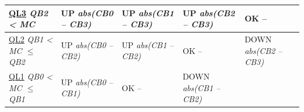 \begin{tabularx}
  {\textwidth}
  { X | X | X | X | X }
  \toprule
      \centering \hspace{4mm} \uline{QL3} \newline \footnotesize \textit{QB2 \textless{} MC} 
    & \centering \hspace{4mm} UP \newline \footnotesize \textit{abs(CB0 -- CB3)} 
    & \centering \hspace{4mm} UP \newline \footnotesize \textit{abs(CB1 -- CB3)} 
    & \centering \hspace{4mm} UP \newline \footnotesize \textit{abs(CB2 -- CB3)} 
    & \centering \hspace{4mm} OK \newline -- 
    \tabularnewline
  \hline
      \centering \hspace{4mm} \uline{QL2} \newline \footnotesize \textit{QB1 \textless{} MC $\leq$ QB2} 
    & \centering \hspace{4mm} UP \newline \footnotesize \textit{abs(CB0 -- CB2)} 
    & \centering \hspace{4mm} UP \newline \footnotesize \textit{abs(CB1 -- CB2)} 
    & \centering \hspace{4mm} OK \newline -- 
    & \centering \hspace{4mm} DOWN \newline \footnotesize \textit{abs(CB2 -- CB3)} 
    \tabularnewline
  \hline
      \centering \hspace{4mm} \uline{QL1} \newline \footnotesize \textit{QB0 \textless{} MC $\leq$ QB1} 
    & \centering \hspace{4mm} UP \newline \footnotesize \textit{abs(CB0 -- CB1)} 
    & \centering \hspace{4mm} OK \newline -- 
    & \centering \hspace{4mm} DOWN \newline \footnotesize \textit{abs(CB1 -- CB2)} 

\end{tabularx}
